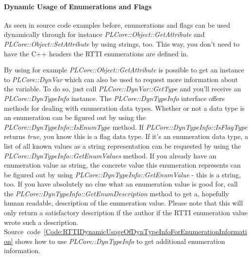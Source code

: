 \paragraph{Dynamic Usage of Enumerations and Flags}
As seen in source code examples before, enumerations and flags can be used dynamically through for instance \emph{PLCore::Object::GetAttribute} and \emph{PLCore::Object::SetAttribute} by using strings, too. This way, you don't need to have the C++ headers the RTTI enumerations are defined in.

By using for example \emph{PLCore::Object::GetAttribute} is possible to get an instance to \emph{PLCore::DynVar} which can also be used to request more information about the variable. To do so, just call \emph{PLCore::DynVar::GetType} and you'll receive an \emph{PLCore::DynTypeInfo} instance. The \emph{PLCore::DynTypeInfo} interface offers methods for dealing with enumeration data types. Whether or not a data type is an enumeration can be figured out by using the \emph{PLCore::DynTypeInfo::IsEnumType} method. If \emph{PLCore::DynTypeInfo::IsFlagType} returns \emph{true}, you know this is a flag data type. If it's an enumeration data type, a list of all known values as a string representation can be requested by using the \emph{PLCore::DynTypeInfo::GetEnumValues} method. If you already have an enumeration value as string, the concrete value this enumeration represents can be figured out by using \emph{PLCore::DynTypeInfo::GetEnumValue} - this is a string, too. If you have absolutely no clue what an enumeration value is good for, call the \emph{PLCore::DynTypeInfo::GetEnumDescription} method to get a, hopefully human readable, description of the enumeration value. Please note that this will only return a satisfactory description if the author if the RTTI enumeration value wrote such a description. Source~code~\ref{Code:RTTIDynamicUsageOfDynTypeInfoForEnumerationInformation} shows how to use \emph{PLCore::DynTypeInfo} to get additional enumeration information.
